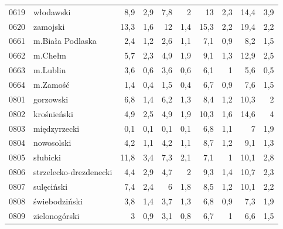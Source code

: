 \begin{center}
\begin{longtable}{lp{3cm}rrrrrrrr}
0619 & włodawski               & 8,9     & 2,9         & 7,8      & 2            & 13       & 2,3          & 14,4     & 3,9          \\
0620 & zamojski                & 13,3    & 1,6         & 12       & 1,4          & 15,3     & 2,2          & 19,4     & 2,2          \\
0661 & m.Biała Podlaska        & 2,4     & 1,2         & 2,6      & 1,1          & 7,1      & 0,9          & 8,2      & 1,5          \\
0662 & m.Chełm                 & 5,7     & 2,3         & 4,9      & 1,9          & 9,1      & 1,3          & 12,9     & 2,5          \\
0663 & m.Lublin                & 3,6     & 0,6         & 3,6      & 0,6          & 6,1      & 1            & 5,6      & 0,5          \\
0664 & m.Zamość                & 1,4     & 0,4         & 1,5      & 0,4          & 6,7      & 0,9          & 7,6      & 1,5          \\
0801 & gorzowski               & 6,8     & 1,4         & 6,2      & 1,3          & 8,4      & 1,2          & 10,3     & 2            \\
0802 & krośnieński             & 4,9     & 2,5         & 4,9      & 1,9          & 10,3     & 1,6          & 14,6     & 4            \\
0803 & międzyrzecki            & 0,1     & 0,1         & 0,1      & 0,1          & 6,8      & 1,1          & 7        & 1,9          \\
0804 & nowosolski              & 4,2     & 1,1         & 4,2      & 1,1          & 8,7      & 1,2          & 9,1      & 1,3          \\
0805 & słubicki                & 11,8    & 3,4         & 7,3      & 2,1          & 7,1      & 1            & 10,1     & 2,8          \\
0806 & strzelecko-drezdenecki  & 4,4     & 2,9         & 4,7      & 2            & 9,3      & 1,4          & 10,7     & 2,3          \\
0807 & sulęciński              & 7,4     & 2,4         & 6        & 1,8          & 8,5      & 1,2          & 10,1     & 2,2          \\
0808 & świebodziński           & 3,8     & 1,4         & 3,7      & 1,3          & 6,8      & 0,9          & 7,3      & 1,9          \\
0809 & zielonogórski           & 3       & 0,9         & 3,1      & 0,8          & 6,7      & 1            & 6,6      & 1,5          \\

\end{longtable}
\end{center}

